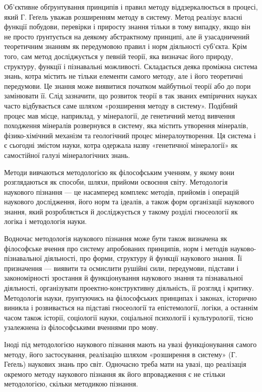 Об’єктивне обґрунтування принципів і правил методу віддзеркалюється в
процесі, який Г. Геґель уважав розширенням методу в систему. Метод реалізує
власні функції побудови, перевірки і приросту знання тільки в тому випадку,
якщо він не просто ґрунтується на деякому абстрактному принципі, але й
узасадничений теоретичним знанням як передумовою правил і норм діяльності
суб’єкта. Крім того, сам метод досліджується у певній теорії, яка визначає його
природу, структуру, функції і пізнавальні можливості. Складається деяка
проміжна система знань, котра містить не тільки елементи самого методу, але і
його теоретичні передумови. Це знання може виявитися початком майбутньої
теорії або до пори замінювати її. Слід зазначити, що розвиток теорії в так
званих емпіричних науках часто відбувається саме шляхом «розширення
методу в систему». Подібний процес мав місце, наприклад, у мінералогії, де
генетичний метод вивчення походження мінералів розвернувся в систему, яка
містить утворення мінералів, фізико-хімічний механізм та геологічний процес
мінералоутворення. Ця система і є сьогодні змістом науки, котра одержала
назву «генетичної мінералогії» як самостійної галузі мінералогічних знань.

Методи вивчаються методологією як філософським ученням, у якому вони
розглядаються як способи, шляхи, прийоми освоєння світу. Методологія
наукового пізнання --- це насамперед комплекс методів, прийомів і операцій 
наукового дослідження, його норм та ідеалів, а також форм організації
наукового знання, який розробляється й досліджується у такому розділі
гносеології як логіка і методологія науки.

Водночас методологія наукового пізнання може бути також визначена як
філософське вчення про систему апробованих принципів, норм і методів
науково-пізнавальної діяльності, про форми, структуру й функції наукового
знання. Її призначення --- виявити та осмислити рушійні сили, передумови,
підстави і закономірності зростання й функціонування наукового знання та
пізнавальної діяльності, організувати проектно-конструктивну діяльність, її
розгляд і критику. Методологія науки, ґрунтуючись на філософських
принципах і законах, історично виникла і розвивається на підставі гносеології
та епістемології, логіки, а останнім часом також історії, соціології науки,
соціальної психології і культурології, тісно узалежнена із філософськими
вченнями про мову.

Іноді під методологією наукового пізнання мають на увазі функціонування
самого методу, його застосування, реалізацію шляхом «розширення в систему»
(Г. Геґель) наукових знань про світ. Одночасно треба мати на увазі, що
реалізація окремого методу наукового пізнання як його впровадження є не
стільки методологією, скільки методикою пізнання.


